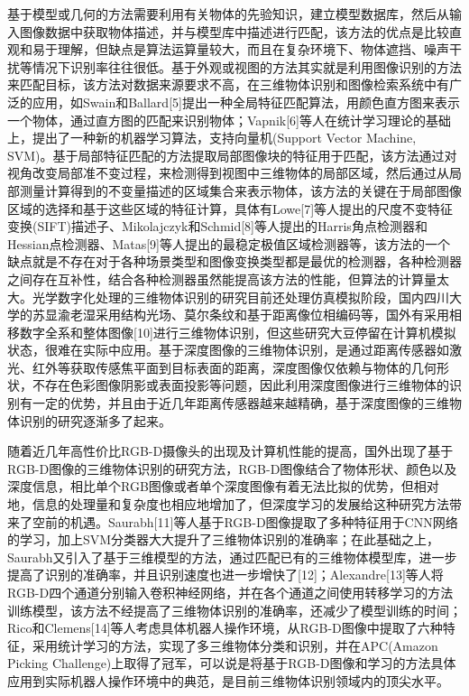 基于模型或几何的方法需要利用有关物体的先验知识，建立模型数据库，然后从输入图像数据中获取物体描述，并与模型库中描述进行匹配，该方法的优点是比较直观和易于理解，但缺点是算法运算量较大，而且在复杂环境下、物体遮挡、噪声干扰等情况下识别率往往很低。基于外观或视图的方法其实就是利用图像识别的方法来匹配目标，该方法对数据来源要求不高，在三维物体识别和图像检索系统中有广泛的应用，如Swain和Ballard[5]提出一种全局特征匹配算法，用颜色直方图来表示一个物体，通过直方图的匹配来识别物体；Vapnik[6]等人在统计学习理论的基础上，提出了一种新的机器学习算法，支持向量机(Support Vector Machine, SVM)。基于局部特征匹配的方法提取局部图像块的特征用于匹配，该方法通过对视角改变局部准不变过程，来检测得到视图中三维物体的局部区域，然后通过从局部测量计算得到的不变量描述的区域集合来表示物体，该方法的关键在于局部图像区域的选择和基于这些区域的特征计算，具体有Lowe[7]等人提出的尺度不变特征变换(SIFT)描述子、Mikolajczyk和Schmid[8]等人提出的Harris角点检测器和Hessian点检测器、Matas[9]等人提出的最稳定极值区域检测器等，该方法的一个缺点就是不存在对于各种场景类型和图像变换类型都是最优的检测器，各种检测器之间存在互补性，结合各种检测器虽然能提高该方法的性能，但算法的计算量太大。光学数字化处理的三维物体识别的研究目前还处理仿真模拟阶段，国内四川大学的苏显渝老湿采用结构光场、莫尔条纹和基于距离像位相编码等，国外有采用相移数字全系和整体图像[10]进行三维物体识别，但这些研究大豆停留在计算机模拟状态，很难在实际中应用。基于深度图像的三维物体识别，是通过距离传感器如激光、红外等获取传感焦平面到目标表面的距离，深度图像仅依赖与物体的几何形状，不存在色彩图像阴影或表面投影等问题，因此利用深度图像进行三维物体的识别有一定的优势，并且由于近几年距离传感器越来越精确，基于深度图像的三维物体识别的研究逐渐多了起来。

随着近几年高性价比RGB-D摄像头的出现及计算机性能的提高，国外出现了基于RGB-D图像的三维物体识别的研究方法，RGB-D图像结合了物体形状、颜色以及深度信息，相比单个RGB图像或者单个深度图像有着无法比拟的优势，但相对地，信息的处理量和复杂度也相应地增加了，但深度学习的发展给这种研究方法带来了空前的机遇。Saurabh[11]等人基于RGB-D图像提取了多种特征用于CNN网络的学习，加上SVM分类器大大提升了三维物体识别的准确率；在此基础之上，Saurabh又引入了基于三维模型的方法，通过匹配已有的三维物体模型库，进一步提高了识别的准确率，并且识别速度也进一步增快了[12]；Alexandre[13]等人将RGB-D四个通道分别输入卷积神经网络，并在各个通道之间使用转移学习的方法训练模型，该方法不经提高了三维物体识别的准确率，还减少了模型训练的时间；Rico和Clemens[14]等人考虑具体机器人操作环境，从RGB-D图像中提取了六种特征，采用统计学习的方法，实现了多三维物体分类和识别，并在APC(Amazon Picking Challenge)上取得了冠军，可以说是将基于RGB-D图像和学习的方法具体应用到实际机器人操作环境中的典范，是目前三维物体识别领域内的顶尖水平。

